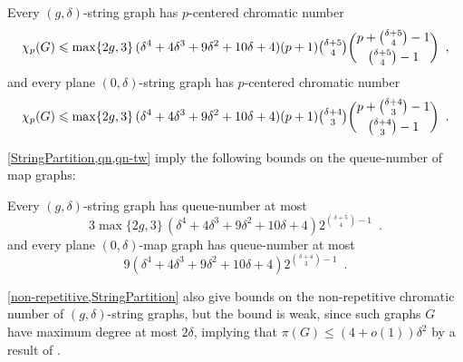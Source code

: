 \documentclass{patmorin}
\DeclareMathOperator{\qn}{qn}
\renewcommand{\le}{\leqslant}
\renewcommand{\geq}{\geqslant}
\renewcommand{\leq}{\leqslant}
\begin{document}
\begin{cor}
Every $(g,\delta)$-string graph has $p$-centered chromatic number  
\[ \chi_p(G)\le \max\{2g,3\} \,(\delta^4 + 4 \delta^3 + 9 \delta^2 + 10 \delta + 4) (p+1) 
\tbinom{ \delta+5}{4} \binom{p+\binom{ \delta+5}{4}-1}{\binom{ \delta+5}{4}-1}\enspace, \]
and every plane $(0,\delta)$-string graph has $p$-centered chromatic number  
\[ \chi_p(G)\le \max\{2g,3\} \,(\delta^4 + 4 \delta^3 + 9 \delta^2 + 10 \delta + 4) (p+1) 
\tbinom{ \delta+4}{3}\binom{p+\binom{ \delta+4}{3}-1}{\binom{ \delta+4}{3}-1}\enspace.\]
\end{cor}

\cref{StringPartition,qn,qn-tw} imply the following bounds on the queue-number of map graphs:

\begin{cor}
Every $(g,\delta)$-string graph has queue-number at most 
\[3 \max\{2g,3\} \,(\delta^4 + 4 \delta^3 + 9 \delta^2 + 10 \delta + 4)  2^{\binom{ \delta+5}{4}-1} \enspace.\]
and every plane $(0,\delta)$-map graph  has queue-number at most 
\[ 9 (\delta^4 + 4 \delta^3 + 9 \delta^2 + 10 \delta + 4)  2^{\binom{ \delta+4}{3}-1} \enspace.\]
\end{cor}






\cref{non-repetitive,StringPartition} also give bounds on the non-repetitive chromatic number of $(g,\delta)$-string graphs, but the bound is weak, since such graphs $G$ have maximum degree at most $2\delta$, implying that $\pi(G) \leq (4+o(1))\delta^2$ by a result of \citet{DJKW16}.
\end{document}
